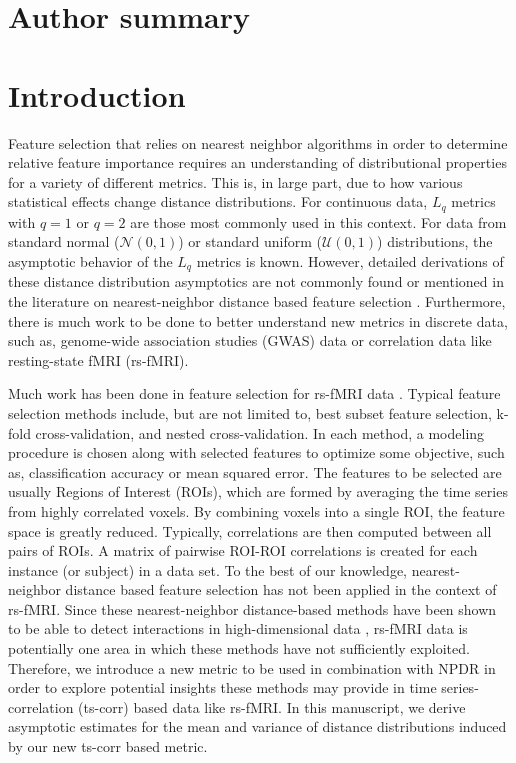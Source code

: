 \documentclass[10pt,letterpaper]{article}\usepackage[]{graphicx}\usepackage[]{color}
\begin{document}
\section*{Author summary}

\linenumbers

\section*{Introduction}
Feature selection that relies on nearest neighbor algorithms in order to determine relative feature importance requires an understanding of distributional properties for a variety of different metrics. This is, in large part, due to how various statistical effects change distance distributions. For continuous data, $L_q$ metrics with $q=1$ or $q=2$ are those most commonly used in this context. For data from standard normal ($\mathcal{N}(0,1)$) or standard uniform ($\mathcal{U}(0,1)$) distributions, the asymptotic behavior of the $L_q$ metrics is known. However, detailed derivations of these distance distribution asymptotics are not commonly found or mentioned in the literature on nearest-neighbor distance based feature selection \cite{urbanowicz17,urbanowicz17b,robnik2003}. Furthermore, there is much work to be done to better understand new metrics in discrete data, such as, genome-wide association studies (GWAS) data or correlation data like resting-state fMRI (rs-fMRI). 

Much work has been done in feature selection for rs-fMRI data \cite{venkataraman2010,hay2017,sundermann2014,vergun2013}. Typical feature selection methods include, but are not limited to, best subset feature selection, k-fold cross-validation, and nested cross-validation. In each method, a modeling procedure is chosen along with selected features to optimize some objective, such as, classification accuracy or mean squared error. The features to be selected are usually Regions of Interest (ROIs), which are formed by averaging the time series from highly correlated voxels. By combining voxels into a single ROI, the feature space is greatly reduced. Typically, correlations are then computed between all pairs of ROIs. A matrix of pairwise ROI-ROI correlations is created for each instance (or subject) in a data set. To the best of our knowledge, nearest-neighbor distance based feature selection has not been applied in the context of rs-fMRI. Since these nearest-neighbor distance-based methods have been shown to be able to detect interactions in high-dimensional data \cite{stir,urbanowicz17,urbanowicz17b}, rs-fMRI data is potentially one area in which these methods have not sufficiently exploited. Therefore, we introduce a new metric to be used in combination with NPDR in order to explore potential insights these methods may provide in time series-correlation (ts-corr) based data like rs-fMRI. In this manuscript, we derive asymptotic estimates for the mean and variance of distance distributions induced by our new ts-corr based metric.
\end{document}
